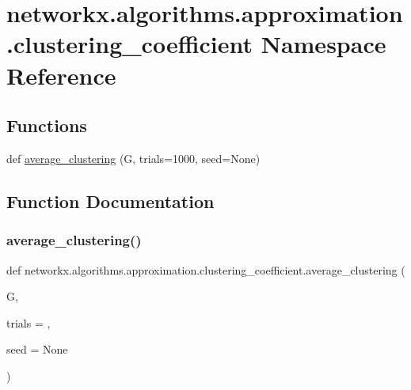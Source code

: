 \hypertarget{namespacenetworkx_1_1algorithms_1_1approximation_1_1clustering__coefficient}{}\section{networkx.\+algorithms.\+approximation.\+clustering\+\_\+coefficient Namespace Reference}
\label{namespacenetworkx_1_1algorithms_1_1approximation_1_1clustering__coefficient}
\subsection*{Functions}
\begin{DoxyCompactItemize}
\item 
def \hyperlink{namespacenetworkx_1_1algorithms_1_1approximation_1_1clustering__coefficient_a199cf6917972b6d8aee9830642002586}{average\+\_\+clustering} (G, trials=1000, seed=None)
\end{DoxyCompactItemize}


\subsection{Function Documentation}
\mbox{\label{namespacenetworkx_1_1algorithms_1_1approximation_1_1clustering__coefficient_a199cf6917972b6d8aee9830642002586}} 
\subsubsection{\texorpdfstring{average\+\_\+clustering()}{average\_clustering()}}
{\footnotesize\ttfamily def networkx.\+algorithms.\+approximation.\+clustering\+\_\+coefficient.\+average\+\_\+clustering (\begin{DoxyParamCaption}\item[{}]{G,  }\item[{}]{trials = {},  }\item[{}]{seed = {\ttfamily None} }\end{DoxyParamCaption})}

